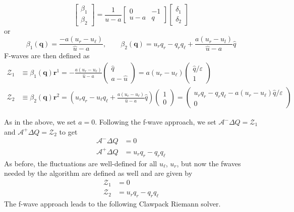 \documentclass{article}
\begin{document}
\begin{equation}
\left[\begin{array}{c} \beta_1 \\ \beta_2 \end{array}\right] = \frac{1}{u-a}
\left[
\begin{array}{rr}
0 & -1 \\ u-a & q
\end{array}
\right]
\left[
\begin{array}{r}
\delta_1 \\ \delta_2
\end{array}
\right]
\end{equation}
or 
\begin{equation}
\beta_1(\mathbf q) = \frac{-a(u_r - u_\ell)}{\widehat{u}-a}, \qquad 
\beta_2(\mathbf q) = u_rq_r - q_rq_\ell + \frac{a(u_r - u_l)}{\widehat{u}-a} \widehat{q}
\end{equation}
F-waves are then defined as 
\begin{align}
\mathcal Z_1 & \equiv \beta_1(\mathbf q) \mathbf r^1 = - \frac{a(u_r - u_\ell)}{\widehat{u}-a} 
\left(\begin{array}{c} \widehat{q} \\ a - \widehat{u}\end{array}\right) 
= a(u_r - u_\ell) \left(\begin{array}{c} \widehat{q}/\varepsilon \\ 1 \end{array}\right) \\
\mathcal Z_2 & \equiv \beta_2(\mathbf q) \mathbf r^2 =
\left(u_r q_r - u_\ell q_\ell + \frac{a(u_r - u_\ell)}{\widehat{u}-a}\widehat{q} \right)
\left(\begin{array}{c} 1 \\ 0\end{array}\right) 
= \left(\begin{array}{c} u_r q_r - q_r q_\ell - a(u_r - u_\ell) \widehat{q}/\varepsilon \\ 
0 \end{array}\right) 
\end{align}

As in the above, we set $a = 0$.  Following the f-wave approach, we set $\mathcal A^- \Delta Q = \mathcal Z_1$ and $\mathcal A^+ \Delta Q = \mathcal Z_2$ to get
\begin{align}
\mathcal A^- \Delta Q & = 0 \\
\mathcal A^+ \Delta Q & = u_r q_r - q_r q_\ell
\end{align}
As before, the fluctuations are well-defined for all $u_\ell$, $u_r$, but now the fwaves needed by the algorithm are defined as well and are given by
\begin{align}
\mathcal Z_1 & = 0 \\
\mathcal Z_2 & = u_r q_r - q_r q_\ell
\end{align}
The f-wave approach leads to the following Clawpack Riemann solver. 
\end{document}
